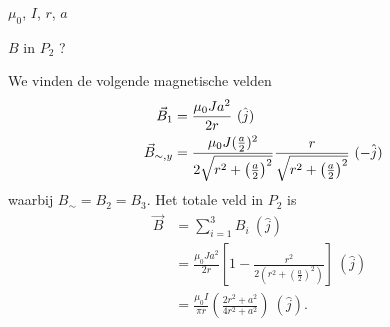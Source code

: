     \begin{minipage}[t]{.48\textwidth}
        \begin{description}[labelwidth=1.5cm, leftmargin=!] 
            \item[Geg. :]  $\mu_0$, $I$, $r$, $a$
            \item[Gevr. :] $B$ in $P_2$ ?
            \item[Opl. :]  
            We vinden de volgende magnetische velden
            \begin{align*}
                \hspace{0.5cm}\vec{B}_1 
                    &= \frac{\mu_0Ja^2}{2r} \ (\hat{j}) \\
                \vec{B}_{\sim, y} 
                    &=  \frac{\mu_0J(\frac{a}{2})^2}{2 \sqrt{r^2 + \left(\frac{a}{2}\right)^2}}\frac{r}{\sqrt{r^2 + \left(\frac{a}{2}\right)^2}} \ (-\hat{j})
            \end{align*}
            waarbij $B_{\sim} = B_2 = B_3$. Het totale veld in $P_2$ is
            \begin{align*}
                \vec{B} 
                    &= \sum_{i=1}^3 B_i \ (\hat{j}) \\
                    &= \frac{\mu_0Ja^2}{2r}\left[1 - \frac{r^2}{2\left(r^2 + \left(\frac{a}{2}\right)^2\right)}\right] \ (\hat{j}) \\
                    &=\frac{\mu_0I}{\pi r}\left(\frac{2r^2+a^2}{4r^2+a^2}\right) \ (\hat{j}).
            \end{align*}
        \end{description}
   \end{minipage}%

\vspace{1cm}
